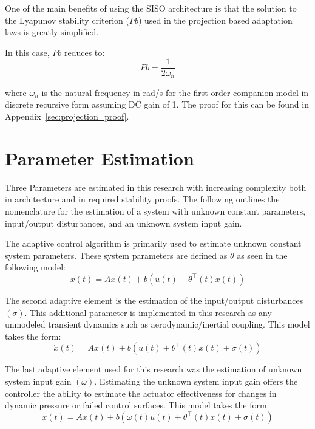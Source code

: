One of the main benefits of using the \ac{SISO} architecture is that the solution to the Lyapunov stability criterion ($Pb$) used in the projection based adaptation laws is greatly simplified.  

In this case, $Pb$ reduces to:
\begin{equation}
Pb = \frac{1}{2\omega_n}
\end{equation}

where $\omega_n$ is the natural frequency in rad/s for the first order companion model in discrete recursive form assuming DC gain of 1.  The proof for this can be found in Appendix~\ref{sec:projection_proof}.

\section{\Lone Parameter Estimation}
Three Parameters are estimated in this research with increasing complexity both in architecture and in required stability proofs.  The following outlines the nomenclature for the estimation of a system with unknown constant parameters, input/output disturbances, and an unknown system input gain.

The \Lone adaptive control algorithm is primarily used to estimate unknown constant system parameters.  These system parameters are defined as $\theta$ as seen in the following model:
\begin{equation}
\dot{x}(t)=Ax(t)+b(u(t)+\theta^{\top}(t)x(t))
\end{equation}

The second adaptive element is the estimation of the input/output disturbances $(\sigma)$.  This additional parameter is implemented in this research as any unmodeled transient dynamics such as aerodynamic/inertial coupling.  This model takes the form:
\begin{equation}
\dot{x}(t)=Ax(t)+b(u(t)+\theta^{\top}(t)x(t)+\sigma(t))
\end{equation}

The last adaptive element used for this research was the estimation of unknown system input gain $(\omega)$.  Estimating the unknown system input gain offers the controller the ability to estimate the actuator effectiveness for changes in dynamic pressure or failed control surfaces.  This model takes the form:
\begin{equation}\label{eq:l_one_model}
\dot{x}(t)=Ax(t)+b(\omega(t)u(t)+\theta^{\top}(t)x(t)+\sigma(t))
\end{equation}  


